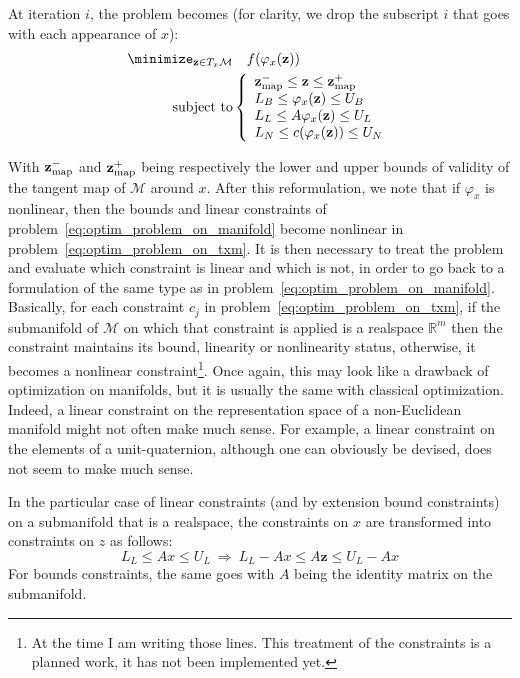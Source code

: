 At iteration $i$, the problem becomes (for clarity, we drop the subscript $i$ that goes with each appearance of $x$):
\begin{align}
\label{eq:optim_problem_on_txm}
  \minimize_{\mathbf{z} \in T_x\mathcal{M}} & \quad f(\varphi_x(\mathbf{z}))\\ \nonumber
  \text{subject to}&\left\{
  \begin{array}{lr}
    {\bf z}_{\text{map}}^- \leq \mathbf{z} \leq {\bf z}_{\text{map}}^+ \\
    L_B \leq \varphi_x(\mathbf{z}) \leq U_B \\
    L_L \leq A\varphi_x(\mathbf{z}) \leq U_L \\
    L_N \leq c(\varphi_x(\mathbf{z})) \leq U_N
  \end{array}\right.
\end{align}

With ${\bf z}_{\text{map}}^-$ and ${\bf z}_{\text{map}}^+$ being respectively the lower and upper bounds of validity of the tangent map of $\mathcal{M}$ around $x$.
After this reformulation, we note that if $\varphi_x$ is nonlinear, then the bounds and linear constraints of problem~\ref{eq:optim_problem_on_manifold} become nonlinear in problem~\ref{eq:optim_problem_on_txm}.
It is then necessary to treat the problem and evaluate which constraint is linear and which is not, in order to go back to a formulation of the same type as in problem~\ref{eq:optim_problem_on_manifold}.
Basically, for each constraint $c_j$ in problem~\ref{eq:optim_problem_on_txm}, if the submanifold of $\mathcal{M}$ on which that constraint is applied is a realspace $\mathbb{R}^m$ then the constraint maintains its bound, linearity or nonlinearity status, otherwise, it becomes a nonlinear constraint\footnote{At the time I am writing those lines. This treatment of the constraints is a planned work, it has not been implemented yet.}.
Once again, this may look like a drawback of optimization on manifolds, but it is usually the same with classical optimization.
Indeed, a linear constraint on the representation space of a non-Euclidean manifold might not often make much sense.
For example, a linear constraint on the elements of a unit-quaternion, although one can obviously be devised, does not seem to make much sense.

In the particular case of linear constraints (and by extension bound constraints) on a submanifold that is a realspace, the constraints on $x$ are transformed into constraints on $z$ as follows:
\begin{equation}
  L_L \leq Ax \leq U_L \ \Rightarrow \ L_L - Ax \leq A\mathbf{z} \leq U_L-Ax
\end{equation}
For bounds constraints, the same goes with $A$ being the identity matrix on the submanifold.


